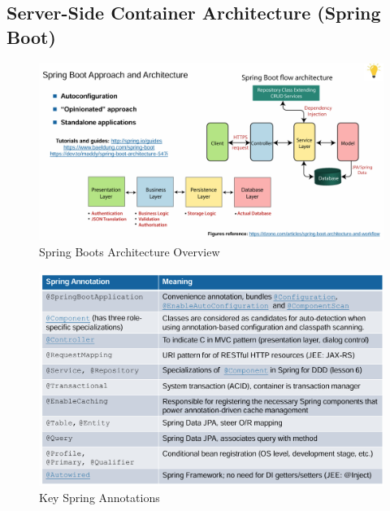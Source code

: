 \documentclass[../Main.tex]{subfiles}
\begin{document}
\subsection{Server-Side Container Architecture (Spring Boot)}

\begin{figure}[H]
    \centering
    \includegraphics[width=1\linewidth]{Images/spring-boot-arch.png}
    \caption{Spring Boots Architecture Overview}
\end{figure}

\begin{figure}[H]
    \centering
    \includegraphics[width=1\linewidth]{Images/spring-boot-annotations.png}
    \caption{Key Spring Annotations}
\end{figure}
\end{document}
